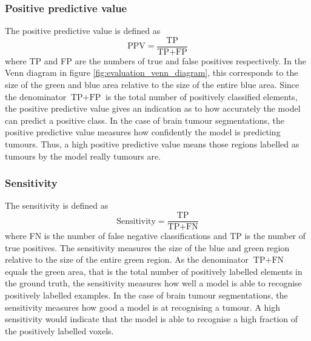 \documentclass[12pt,a4paper,twoside,openright]{report}
\begin{document}
\subsubsection{Positive predictive value}
The positive predictive value is defined as
\begin{equation}
	\textrm{PPV} = \frac{\textrm{TP}}{\textrm{TP} + \textrm{FP}}
\end{equation}
where \textrm{TP} and \textrm{FP} are the numbers of true and false positives respectively. In the Venn diagram in figure \ref{fig:evaluation_venn_diagram}, this corresponds to the size of the green and blue area relative to the size of the entire blue area.  Since the denominator $\textrm{TP} + \textrm{FP}$ is the total number of positively classified elements, the positive predictive value gives an indication as to how accurately the model can predict a positive class. In the case of brain tumour segmentations, the positive predictive value measures how confidently the model is predicting tumours. Thus, a high positive predictive value means those regions labelled as tumours by the model really tumours are.

\subsubsection{Sensitivity}
The sensitivity is defined as 
\begin{equation}
	\textrm{Sensitivity} = \frac{\textrm{TP}}{\textrm{TP} + \textrm{FN}}
\end{equation}
where \textrm{FN} is the number of false negative classifications and \textrm{TP} is the number of true positives. The sensitivity measures the size of the blue and green region relative to the size of the entire green region. As the denominator $\textrm{TP} + \textrm{FN}$ equals the green area, that is the total number of positively labelled elements in the ground truth, the sensitivity measures how well a model is able to recognise positively labelled examples. In the case of brain tumour segmentations, the sensitivity measures how good a model is at recognising a tumour. A high sensitivity would indicate that the model is able to recognise a high fraction of the positively labelled voxels.
\end{document}
